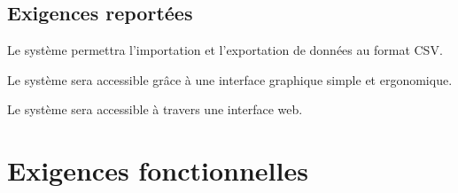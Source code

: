 
\subsection{Exigences reportées}

\begin{requirement}
	Le système permettra l'importation et l'exportation de données au format CSV.
\end{requirement}

\begin{requirement}
	Le système sera accessible grâce à une interface graphique simple et ergonomique. 
\end{requirement}

\begin{requirement}
	Le système sera accessible à travers une interface web.
\end{requirement}



\section{Exigences fonctionnelles}

